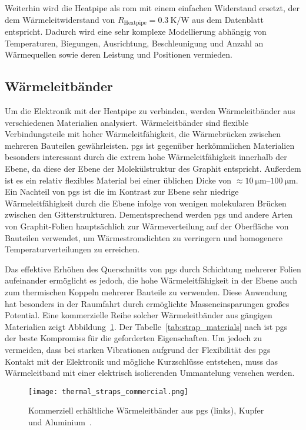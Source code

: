 Weiterhin wird die Heatpipe als \ac{rom} mit einem einfachen Widerstand ersetzt, der dem Wärmeleitwiderstand von $R_\mathrm{Heatpipe} = \SI{0,3}{\kelvin\per\watt}$ aus dem Datenblatt~\cite{QuickOhm-Heatpipe-5x400} entspricht.
Dadurch wird eine sehr komplexe Modellierung abhängig von Temperaturen, Biegungen, Ausrichtung, Beschleunigung und Anzahl an Wärmequellen sowie deren Leistung und Positionen vermieden.

\subsection{Wärmeleitbänder}\label{sec:waermebaender}

Um die Elektronik mit der Heatpipe zu verbinden, werden Wärmeleitbänder aus verschiedenen Materialien analysiert.
Wärmeleitbänder sind flexible Verbindungsteile mit hoher Wärmeleitfähigkeit, die Wärmebrücken zwischen mehreren Bauteilen gewährleisten.
\ac{pgs} ist gegenüber herkömmlichen Materialien besonders interessant durch die extrem hohe Wärmeleitfähigkeit innerhalb der Ebene,
da diese der Ebene der Molekülstruktur des Graphit entspricht. Außerdem ist es ein relativ flexibles Material bei einer üblichen Dicke von $\approx \SIrange{10}{100}{\micro\meter}$.
Ein Nachteil von \ac{pgs} ist die im Kontrast zur Ebene sehr niedrige Wärmeleitfähigkeit durch die Ebene infolge von wenigen
molekularen Brücken zwischen den Gitterstrukturen. Dementsprechend werden \ac{pgs} und andere Arten von Graphit-Folien hauptsächlich zur
Wärmeverteilung auf der Oberfläche von Bauteilen verwendet, um Wärmestromdichten zu verringern und homogenere Temperaturverteilungen zu erreichen.

Das effektive Erhöhen des Querschnitts von \ac{pgs} durch Schichtung mehrerer Folien aufeinander ermöglicht es jedoch, die hohe
Wärmeleitfähigkeit in der Ebene auch zum thermischen Koppeln mehrerer Bauteile zu verwenden. Diese Anwendung hat besonders in der 
Raumfahrt durch ermöglichte Masseneinsparungen großes Potential. Eine kommerzielle Reihe solcher Wärmeleitbänder aus gängigen Materialien zeigt Abbildung~\ref{fig:thermalstraps_commercial}.
Der Tabelle~\ref{tab:strap_materials} nach ist \ac{pgs} der beste Kompromiss für die geforderten Eigenschaften. Um jedoch zu vermeiden, dass
bei starken Vibrationen aufgrund der Flexibilität des \ac{pgs} Kontakt mit der Elektronik und mögliche Kurzschlüsse entstehen, muss das Wärmeleitband mit einer elektrisch
isolierenden Ummantelung versehen werden.

\begin{figure}
  \centering
  \texttt{[image: thermal\_straps\_commercial.png]}
  \caption{Kommerziell erhältliche Wärmeleitbänder aus \acs{pgs} (links), Kupfer und Aluminium~\cite{Thermal-Straps}.}\label{fig:thermalstraps_commercial}
\end{figure}

